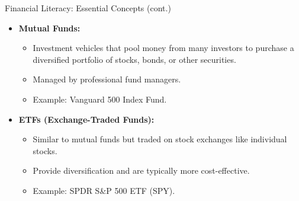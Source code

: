 \documentclass{beamer}
\begin{document}
\begin{frame}{Financial Literacy: Essential Concepts (cont.)}
    \begin{itemize}
        \item \textbf{Mutual Funds:}
        \begin{itemize}
            \item Investment vehicles that pool money from many investors to purchase a diversified portfolio of stocks, bonds, or other securities.
            \item Managed by professional fund managers.
            \item Example: Vanguard 500 Index Fund.
        \end{itemize}
        \item \textbf{ETFs (Exchange-Traded Funds):}
        \begin{itemize}
            \item Similar to mutual funds but traded on stock exchanges like individual stocks.
            \item Provide diversification and are typically more cost-effective.
            \item Example: SPDR S&P 500 ETF (SPY).
        \end{itemize}
    \end{itemize}
\end{frame}
\end{document}
